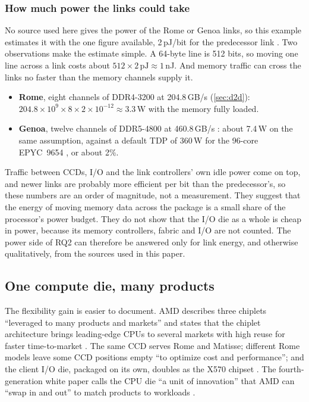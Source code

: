 \subsubsection*{How much power the links could take}
No source used here gives the power of the Rome or Genoa links, so this example estimates it with the one figure available, 2\,pJ/bit for the predecessor link \cite{naffziger2020chiplet}. Two observations make the estimate simple. A 64-byte line is 512 bits, so moving one line across a link costs about $512 \times 2\,\text{pJ} \approx 1$\,nJ. And memory traffic can cross the links no faster than the memory channels supply it.
\begin{itemize}
  \item \textbf{Rome}, eight channels of DDR4-3200 at 204.8\,GB/s (\cref{sec:d2d}): $204.8 \times 10^{9} \times 8 \times 2 \times 10^{-12} \approx 3.3$\,W with the memory fully loaded.
  \item \textbf{Genoa}, twelve channels of DDR5-4800 at 460.8\,GB/s \cite{advancedmicrodevicesinc.AMDEPYC90042023}: about 7.4\,W on the same assumption, against a default TDP of 360\,W for the 96-core EPYC~9654 \cite{advancedmicrodevicesinc.AMDEPYC90042023}, or about 2\%.
\end{itemize}
Traffic between CCDs, I/O and the link controllers' own idle power come on top, and newer links are probably more efficient per bit than the predecessor's, so these numbers are an order of magnitude, not a measurement. They suggest that the energy of moving memory data across the package is a small share of the processor's power budget. They do not show that the I/O die as a whole is cheap in power, because its memory controllers, fabric and I/O are not counted. The power side of RQ2 can therefore be answered only for link energy, and otherwise qualitatively, from the sources used in this paper.

\subsection{One compute die, many products}
\label{sec:product-flexibility}
The flexibility gain is easier to document. AMD describes three chiplets ``leveraged to many products and markets'' and states that the chiplet architecture brings leading-edge CPUs to several markets with high reuse for faster time-to-market \cite[Fig.~2.2.1]{naffziger2020chiplet}. The same CCD serves Rome and Matisse; different Rome models leave some CCD positions empty ``to optimize cost and performance''; and the client I/O die, packaged on its own, doubles as the X570 chipset \cite{naffziger2020chiplet}. The fourth-generation white paper calls the CPU die ``a unit of innovation'' that AMD can ``swap in and out'' to match products to workloads \cite{advancedmicrodevicesinc.4thGenAMD2023}.

